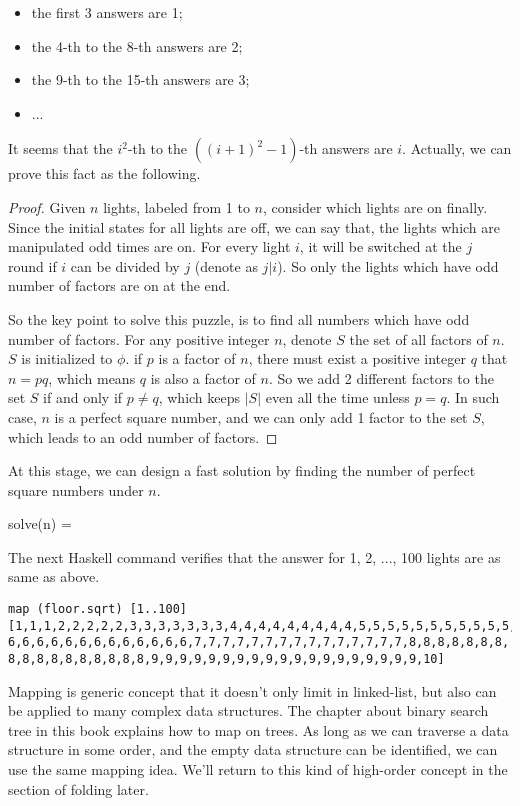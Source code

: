 \documentclass[b5paper]{article}
\begin{document}
\begin{itemize}
\item the first 3 answers are 1;
\item the 4-th to the 8-th answers are 2;
\item the 9-th to the 15-th answers are 3;
\item ...
\end{itemize}

It seems that the $i^2$-th to the $((i+1)^2-1)$-th answers are $i$. Actually, we can prove this fact as the following.

\begin{proof}
Given $n$ lights, labeled from 1 to $n$, consider which lights are on finally. Since the initial states for all lights
are off, we can say that, the lights which are manipulated odd times are on. For every light $i$, it will be switched
at the $j$ round if $i$ can be divided by $j$ (denote as $j | i$). So only the lights which have odd number of factors are on at the end.

So the key point to solve this puzzle, is to find all numbers which have odd number of factors. For any positive integer
$n$, denote $S$ the set of all factors of $n$. $S$ is initialized to $\phi$. if $p$ is a factor of $n$, there must
exist a positive integer $q$ that $n = p q$, which means $q$ is also a factor of $n$. So we add 2 different factors to
the set $S$ if and only if $p \neq q$, which keeps $|S|$ even all the time unless $p = q$. In such case, $n$ is a
perfect square number, and we can only add 1 factor to the set $S$, which leads to an odd number of factors.
\end{proof}


At this stage, we can design a fast solution by finding the number of perfect square numbers under $n$.

\be
solve(n) = \lfloor {} \rfloor
\ee

The next Haskell command verifies that the answer for 1, 2, ..., 100 lights are as same as above.

\begin{lstlisting}
map (floor.sqrt) [1..100]
[1,1,1,2,2,2,2,2,3,3,3,3,3,3,3,4,4,4,4,4,4,4,4,4,5,5,5,5,5,5,5,5,5,5,5,
6,6,6,6,6,6,6,6,6,6,6,6,6,7,7,7,7,7,7,7,7,7,7,7,7,7,7,7,8,8,8,8,8,8,8,
8,8,8,8,8,8,8,8,8,8,9,9,9,9,9,9,9,9,9,9,9,9,9,9,9,9,9,9,9,10]
\end{lstlisting}

Mapping is generic concept that it doesn't only limit in linked-list, but also can be applied to many
complex data structures. The chapter about binary search tree in this book explains how to map on trees.
As long as we can traverse a data structure in some order, and the empty data structure can be identified,
we can use the same mapping idea. We'll return to this kind of high-order concept in the section of folding
later.
\end{document}
